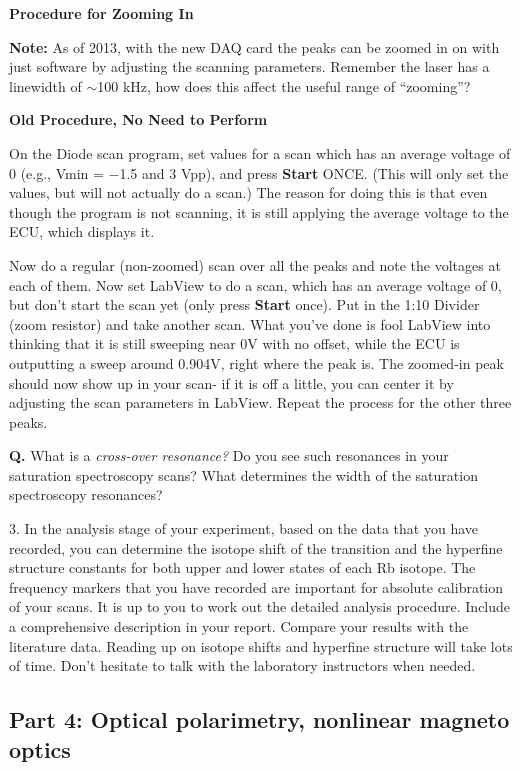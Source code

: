 \documentclass{../lab}
\begin{document}
\textbf{Procedure for Zooming In}

\textbf{Note:} As of 2013, with the new DAQ card the peaks can be zoomed in on with just software by adjusting the scanning parameters. Remember the laser has a linewidth of $\sim$100 kHz, how does this affect the useful range of ``zooming''?

\textbf{Old Procedure, No Need to Perform}

On the Diode scan program, set values for a scan which has an average voltage of 0 (e.g., Vmin = $-$1.5 and 3 Vpp), and press \textbf{Start} ONCE. (This will only set the values, but will not actually do a scan.) The reason for doing this is that even though the program is not scanning, it is still applying the average voltage to the ECU, which displays it.

Now do a regular (non-zoomed) scan over all the peaks and note the voltages at each of them. Now set LabView to do a scan, which has an average voltage of 0, but don't start the scan yet (only press \textbf{Start} once). Put in the 1:10 Divider (zoom resistor) and take another scan. What you've done is fool LabView into thinking that it is still sweeping near 0V with no offset, while the ECU is outputting a sweep around 0.904V, right where the peak is. The zoomed-in peak should now show up in your scan- if it is off a little, you can center it by adjusting the scan parameters in LabView. Repeat the process for the other three peaks.

\textbf{Q.} What is a \emph{cross-over resonance?} Do you see such resonances in your saturation spectroscopy scans? What determines the width of the saturation spectroscopy resonances?

3. In the analysis stage of your experiment, based on the data that you have recorded, you can determine the isotope shift of the transition and the hyperfine structure constants for both upper and lower states of each Rb isotope. The frequency markers that you have recorded are important for absolute calibration of your scans. It is up to you to work out the detailed analysis procedure. Include a comprehensive description in your report. Compare your results with the literature data. Reading up on isotope shifts and hyperfine structure will take lots of time. Don't hesitate to talk with the laboratory instructors when needed.

\subsection{Part 4: Optical polarimetry, nonlinear magneto optics}
\end{document}
